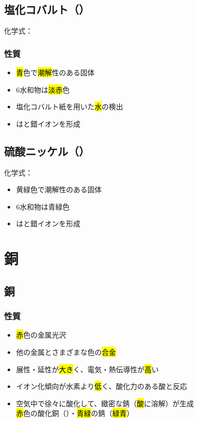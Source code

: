  \subsection{塩化コバルト（）}
 化学式：\hl{}
 \subsubsection{性質}
 \begin{itemize}
  \item \hl{青}色で\hl{潮解}性のある固体
  \item 6水和物は\hl{淡赤}色
  \item 塩化コバルト紙を用いた\hl{水}の検出
  \item {}は\hl{}と錯イオンを形成
 \end{itemize}
 \subsection{硫酸ニッケル（）}
 化学式：\hl{}
 \begin{itemize}
  \item 黄緑色で潮解性のある固体
  \item 6水和物は青緑色
  \item {}は\hl{}と錯イオンを形成
 \end{itemize}
 \section{銅}
 \subsection{銅}
 \subsubsection{性質}
 \begin{itemize}
  \item \hl{赤}色の金属光沢
  \item 他の金属とさまざまな色の\hl{合金}
  \item 展性・延性が\hl{大き}く、電気・熱伝導性が\hl{高}い
  \item イオン化傾向が水素より\hl{低}く、酸化力のある酸と反応\\
  \item 空気中で徐々に酸化して、緻密な錆（\hl{酸}に溶解）が生成\\
  \hl{赤}色の酸化銅（）・\hl{青緑}の錆（\hl{緑青}）
 \end{itemize}
